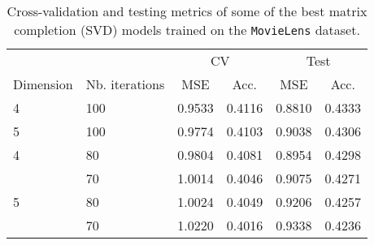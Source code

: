 \begin{table}
\centering
\begin{tabular}{llcccc}
\toprule
  &     &   \multicolumn{2}{c}{CV} & \multicolumn{2}{c}{Test}\\
  \cmidrule(lr){3-4}\cmidrule(lr){5-6}
Dimension & Nb. iterations &        MSE & Acc. & MSE & Acc.  \\
\midrule
4 & 100 &  0.9533 &      0.4116 &   0.8810 &        0.4333 \\
5 & 100 &  0.9774 &      0.4103 &   0.9038 &        0.4306 \\
4 & 80  &  0.9804 &      0.4081 &   0.8954 &        0.4298 \\
  & 70  &  1.0014 &      0.4046 &   0.9075 &        0.4271 \\
5 & 80  &  1.0024 &      0.4049 &   0.9206 &        0.4257 \\
  & 70  &  1.0220 &      0.4016 &   0.9338 &        0.4236 \\
\bottomrule
\end{tabular}
\caption{Cross-validation and testing metrics of some of the best matrix completion (SVD) models trained on the \texttt{MovieLens} dataset. }
\label{tab:results.svd}
\end{table}
